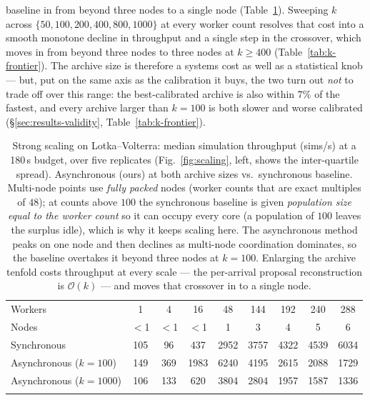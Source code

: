 baseline in from beyond three nodes to a single node (Table~\ref{tab:scaling}). Sweeping $k$ across $\{50,100,200,400,800,1000\}$ at every worker count resolves that cost into a smooth monotone decline in throughput and a single step in the crossover, which moves in from beyond three nodes to three nodes at $k\ge400$ (Table~\ref{tab:k-frontier}). The archive size is therefore a systems cost as well as a statistical knob --- but, put on the same axis as the calibration it buys, the two turn out \emph{not} to trade off over this range: the best-calibrated archive is also within $7\%$ of the fastest, and every archive larger than $k=100$ is both slower and worse calibrated (\S\ref{sec:results-validity}, Table~\ref{tab:k-frontier}).

\begin{table}[t]
\caption{Strong scaling on Lotka--Volterra: median simulation throughput (sims/s) at a 180\,s budget, over five replicates (Fig.~\ref{fig:scaling}, left, shows the inter-quartile spread). Asynchronous (ours) at both archive sizes vs.\ synchronous baseline. Multi-node points use \emph{fully packed} nodes (worker counts that are exact multiples of $48$); at counts above $100$ the synchronous baseline is given \emph{population size equal to the worker count} so it can occupy every core (a population of $100$ leaves the surplus idle), which is why it keeps scaling here. The asynchronous method peaks on one node and then declines as multi-node coordination dominates, so the baseline overtakes it beyond three nodes at $k=100$. Enlarging the archive tenfold costs throughput at every scale --- the per-arrival proposal reconstruction is $\mathcal{O}(k)$ --- and moves that crossover in to a single node.}\label{tab:scaling}
\centering
\begin{tabular}{@{}lcccccccc@{}}
\toprule
Workers & 1 & 4 & 16 & 48 & 144 & 192 & 240 & 288 \\
Nodes & $<$1 & $<$1 & $<$1 & 1 & 3 & 4 & 5 & 6 \\
\midrule
Synchronous & 105 & 96 & 437 & 2952 & 3757 & 4322 & 4539 & 6034 \\
Asynchronous ($k=100$) & 149 & 369 & 1983 & 6240 & 4195 & 2615 & 2088 & 1729 \\
Asynchronous ($k=1000$) & 106 & 133 & 620 & 3804 & 2804 & 1957 & 1587 & 1336 \\
\botrule
\end{tabular}
\end{table}

